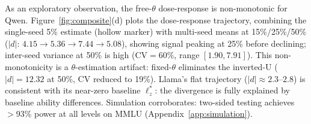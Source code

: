 As an exploratory observation, the free-$\theta$ dose-response is non-monotonic for Qwen.
Figure~\ref{fig:composite}(d) plots the dose-response trajectory, combining the single-seed 5\% estimate (hollow marker) with multi-seed means at 15\%/25\%/50\% ($|d|$: $4.15 \to 5.36 \to 7.44 \to 5.08$), showing signal peaking at 25\% before declining; inter-seed variance at 50\% is high (CV${=}$60\%, range $[1.90, 7.91]$).
This non-monotonicity is a $\theta$-estimation artifact: fixed-$\theta$ eliminates the inverted-U ($|d|{=}12.32$ at 50\%, CV reduced to 19\%).
Llama's flat trajectory ($|d|{\approx}2.3$--$2.8$) is consistent with its near-zero baseline $\ell_z^*$: the divergence is fully explained by baseline ability differences.
Simulation corroborates: two-sided testing achieves ${>}$93\% power at all levels on MMLU (Appendix~\ref{app:simulation}).
